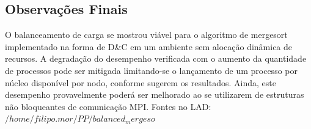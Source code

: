 \documentclass{article}
\begin{document}
\begin{multicols*}{2}
\section{Observações Finais}
O balanceamento de carga se mostrou viável para o algoritmo de
mergesort implementado na forma de D\&C em um ambiente sem
alocação dinâmica de recursos. A degradação do desempenho
verificada com o aumento da quantidade de processos pode ser
mitigada limitando-se o lançamento de um processo por núcleo
disponível por nodo, conforme sugerem os resultados. Ainda, este
desempenho provavelmente poderá ser melhorado ao se utilizarem
de estruturas não bloqueantes de comunicação MPI.
Fontes no LAD: $/home/filipo.mor/PP/balanced_mergeso$

\end{multicols*}
\end{document}

